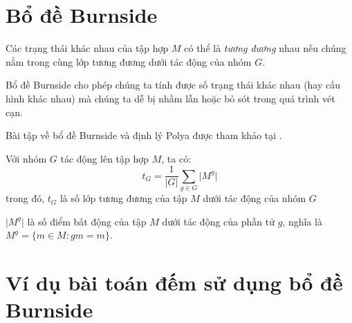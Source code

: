 \section{Bổ đề Burnside}

Các trạng thái khác nhau của tập hợp $M$ có thể là \textit{tương đương} nhau nếu chúng nằm trong cùng lớp tương đương dưới tác động của nhóm $G$.

Bổ đề Burnside cho phép chúng ta tính được số trạng thái khác nhau (hay cấu hình khác nhau) mà chúng ta dễ bị nhầm lẫn hoặc bỏ sót trong quá trình vét cạn.

Bài tập về bổ đề Burnside và định lý Polya được tham khảo tại \cite{Tarannikov}.

\begin{lemma}[Bổ đề Burnside]
    Với nhóm $G$ tác động lên tập hợp $M$, ta có:
    \[t_G = \frac{1}{\lvert G \rvert} \sum_{g \in G} \lvert M^g \rvert \]
    trong đó, $t_G$ là số lớp tương đương của tập $M$ dưới tác động của nhóm $G$

    $\lvert M^g \rvert$ là số điểm bất động của tập $M$ dưới tác động của phần tử $g$, nghĩa là $M^g = \{ m \in M : gm = m\}$.
\end{lemma}

\section{Ví dụ bài toán đếm sử dụng bổ đề Burnside}

